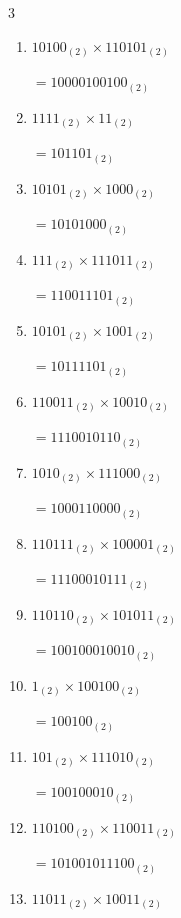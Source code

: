 \begin{multicols}{3}
\begin{enumerate}
        $=1001010110_{(2)}$

  \item $10100_{(2)} \times 110101_{(2)}$

        $=10000100100_{(2)}$

  \item $1111_{(2)} \times 11_{(2)}$

        $=101101_{(2)}$

  \item $10101_{(2)} \times 1000_{(2)}$

        $=10101000_{(2)}$

\columnbreak %

  \item $111_{(2)} \times 111011_{(2)}$

        $=110011101_{(2)}$

  \item $10101_{(2)} \times 1001_{(2)}$

        $=10111101_{(2)}$

  \item $110011_{(2)} \times 10010_{(2)}$

        $=1110010110_{(2)}$

  \item $1010_{(2)} \times 111000_{(2)}$

        $=1000110000_{(2)}$

  \item $110111_{(2)} \times 100001_{(2)}$

        $=11100010111_{(2)}$

\columnbreak %

\resetques

  \item $110110_{(2)} \times 101011_{(2)}$

        $=100100010010_{(2)}$

  \item $1_{(2)} \times 100100_{(2)}$

        $=100100_{(2)}$

  \item $101_{(2)} \times 111010_{(2)}$

        $=100100010_{(2)}$

  \item $110100_{(2)} \times 110011_{(2)}$

        $=101001011100_{(2)}$

  \item $11011_{(2)} \times 10011_{(2)}$


\end{enumerate}
\end{multicols}
